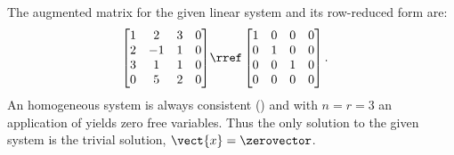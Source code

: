 The augmented matrix for the given linear system and its row-reduced form are:
\begin{align*}
\begin{bmatrix}
1 & 2 & 3 & 0\\
2 & -1 & 1 & 0\\
3 & 1 & 1 & 0\\
0 & 5 & 2 & 0
\end{bmatrix}
&\rref
\begin{bmatrix}
1 & 0 & 0 & 0\\
0 & 1 & 0 & 0\\
0 & 0 & 1 & 0\\
0 & 0 & 0 & 0
\end{bmatrix}.
\end{align*}
An homogeneous system is always consistent () and with $n=r=3$ an application of  yields zero free variables. Thus the only solution to the given system is the trivial solution, $\vect{x} = \zerovector$.